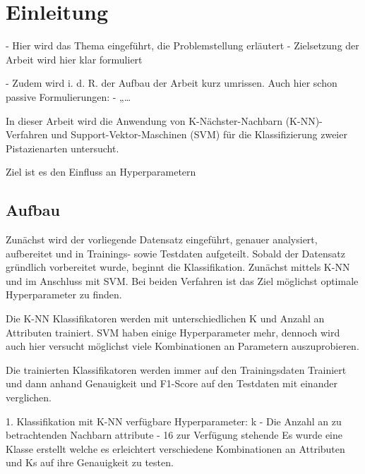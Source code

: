 
\section{Einleitung}

- Hier wird das Thema eingeführt, die Problemstellung erläutert 
- Zielsetzung der Arbeit wird hier klar formuliert

- Zudem wird i. d. R. der Aufbau der Arbeit kurz umrissen.
Auch hier schon passive Formulierungen:
- „…


In dieser Arbeit wird die Anwendung von K-Nächster-Nachbarn (K-NN)-Verfahren und Support-Vektor-Maschinen (SVM) für die Klassifizierung zweier Pistazienarten untersucht. 

Ziel ist es den Einfluss an Hyperparametern 

\subsection{Aufbau}
Zunächst wird der vorliegende Datensatz eingeführt, genauer analysiert, aufbereitet und in Trainings- sowie Testdaten aufgeteilt.
Sobald der Datensatz gründlich vorbereitet wurde, beginnt die Klassifikation.
Zunächst mittels K-NN und im Anschluss mit SVM.
Bei beiden Verfahren ist das Ziel möglichst optimale Hyperparameter zu finden.

Die K-NN Klassifikatoren werden mit unterschiedlichen \glqq{}K\grqq{} und Anzahl an Attributen trainiert. 
SVM haben einige Hyperparameter mehr, dennoch wird auch hier versucht möglichst viele Kombinationen an Parametern auszuprobieren.

Die trainierten Klassifikatoren werden immer auf den Trainingsdaten Trainiert und dann anhand Genauigkeit und F1-Score auf den Testdaten mit einander verglichen.





1. Klassifikation mit K-NN
verfügbare Hyperparameter:
 k - Die Anzahl an zu betrachtenden Nachbarn
 attribute - 16 zur Verfügung stehende
Es wurde eine Klasse erstellt welche es erleichtert verschiedene Kombinationen an Attributen und Ks auf ihre Genauigkeit zu testen. 
